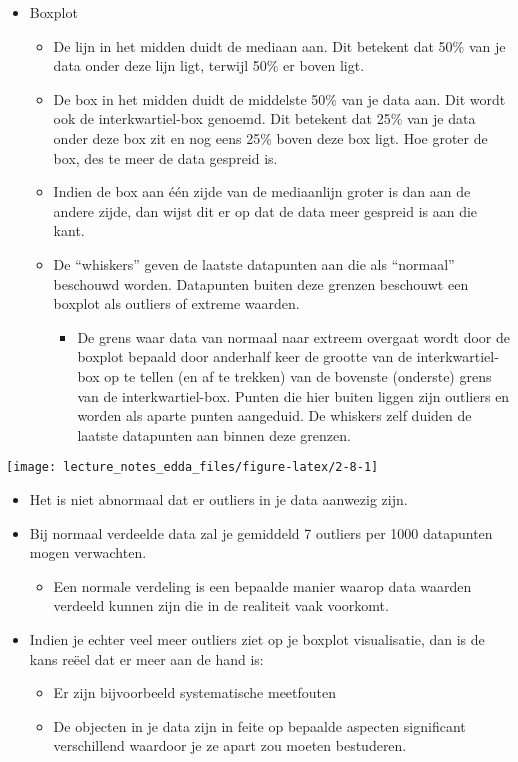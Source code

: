 \documentclass[]{memoir}
\providecommand{\tightlist}{%
  \setlength{\itemsep}{0pt}\setlength{\parskip}{0pt}}
\begin{document}
\begin{itemize}
\tightlist
\item
  Boxplot

  \begin{itemize}
  \tightlist
  \item
    De lijn in het midden duidt de mediaan aan. Dit betekent dat 50\% van je data onder deze lijn ligt, terwijl 50\% er boven ligt.
  \item
    De box in het midden duidt de middelste 50\% van je data aan. Dit wordt ook de interkwartiel-box genoemd. Dit betekent dat 25\% van je data onder deze box zit en nog eens 25\% boven deze box ligt. Hoe groter de box, des te meer de data gespreid is.
  \item
    Indien de box aan één zijde van de mediaanlijn groter is dan aan de andere zijde, dan wijst dit er op dat de data meer gespreid is aan die kant.
  \item
    De ``whiskers'' geven de laatste datapunten aan die als ``normaal'' beschouwd worden. Datapunten buiten deze grenzen beschouwt een boxplot als outliers of extreme waarden.

    \begin{itemize}
    \tightlist
    \item
      De grens waar data van normaal naar extreem overgaat wordt door de boxplot bepaald door anderhalf keer de grootte van de interkwartiel-box op te tellen (en af te trekken) van de bovenste (onderste) grens van de interkwartiel-box. Punten die hier buiten liggen zijn outliers en worden als aparte punten aangeduid. De whiskers zelf duiden de laatste datapunten aan binnen deze grenzen.
    \end{itemize}
  \end{itemize}
\end{itemize}

\texttt{[image: lecture\_notes\_edda\_files/figure-latex/2-8-1]}

\begin{itemize}
\tightlist
\item
  Het is niet abnormaal dat er outliers in je data aanwezig zijn.
\item
  Bij normaal verdeelde data zal je gemiddeld 7 outliers per 1000 datapunten mogen verwachten.

  \begin{itemize}
  \tightlist
  \item
    Een normale verdeling is een bepaalde manier waarop data waarden verdeeld kunnen zijn die in de realiteit vaak voorkomt.
  \end{itemize}
\item
  Indien je echter veel meer outliers ziet op je boxplot visualisatie, dan is de kans reëel dat er meer aan de hand is:

  \begin{itemize}
  \tightlist
  \item
    Er zijn bijvoorbeeld systematische meetfouten
  \item
    De objecten in je data zijn in feite op bepaalde aspecten significant verschillend waardoor je ze apart zou moeten bestuderen.
  \end{itemize}
\end{itemize}
\end{document}
